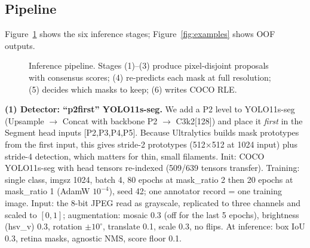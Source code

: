 \documentclass[sigconf]{acmart}
\begin{document}
\subsection{Pipeline}
Figure~\ref{fig:pipeline} shows the six inference stages; Figure~\ref{fig:examples} shows OOF outputs.

\begin{figure}[t]\centering
{}
\caption{Inference pipeline. Stages (1)--(3) produce pixel-disjoint proposals with consensus scores; (4) re-predicts each mask at full resolution; (5) decides which masks to keep; (6) writes COCO RLE.}
\label{fig:pipeline}
\end{figure}

\textbf{(1) Detector: ``p2first'' YOLO11s-seg.} We add a P2 level to YOLO11s-seg \cite{ultralytics2024yolo11} (Upsample $\to$ Concat with backbone P2 $\to$ C3k2[128]) and place it \emph{first} in the Segment head inputs [P2,P3,P4,P5]. Because Ultralytics builds mask prototypes from the first input, this gives stride-2 prototypes (512$\times$512 at 1024 input) plus stride-4 detection, which matters for thin, small filaments. Init: COCO YOLO11s-seg with head tensors re-indexed (509/639 tensors transfer). Training: single class, imgsz 1024, batch 4, 80 epochs at mask\_ratio 2 then 20 epochs at mask\_ratio 1 (AdamW $10^{-4}$), seed 42; one annotator record = one training image. Input: the 8-bit JPEG read as grayscale, replicated to three channels and scaled to $[0,1]$; augmentation: mosaic 0.3 (off for the last 5 epochs), brightness (hsv\_v) 0.3, rotation $\pm10^\circ$, translate 0.1, scale 0.3, no flips. At inference: box IoU 0.3, retina masks, agnostic NMS, score floor 0.1.
\end{document}
